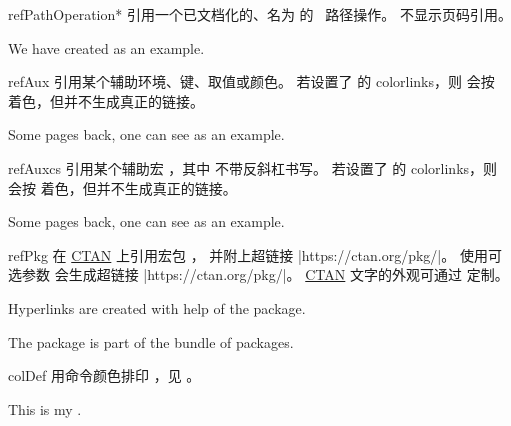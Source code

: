 \begin{docCommand}[doc new=2019-09-17]{refPathOperation*}{}
  引用一个已文档化的、名为  的 \tikzname\ 路径操作。
  不显示页码引用。
\begin{dispExample}
We have created  as an example.
\end{dispExample}
\end{docCommand}



\begin{docCommand}[doc updated=2020-02-11]{refAux}{}
  引用某个辅助环境、键、取值或颜色。
  若设置了  的 colorlinks，则  会按
   着色，但并不生成真正的链接。
\begin{dispExample}
Some pages back, one can see  as an example.
\end{dispExample}
\end{docCommand}

\begin{docCommand}[doc updated=2020-02-11]{refAuxcs}{}
  引用某个辅助宏 ，其中  不带反斜杠书写。
  若设置了  的 colorlinks，则  会按
   着色，但并不生成真正的链接。
\begin{dispExample}
Some pages back, one can see  as an example.
\end{dispExample}
\end{docCommand}


\begin{docCommand}[doc new and updated={2024-09-18}{2024-11-29}]{refPkg}{}
  在 \href{https://ctan.org}{CTAN} 上引用宏包 ，
  并附上超链接 \mbox{|https://ctan.org/pkg/|}。
  使用可选参数  会生成超链接
  \mbox{|https://ctan.org/pkg/|}。
  \href{https://ctan.org}{CTAN} 文字的外观可通过
   定制。
\begin{dispExample}
Hyperlinks are created with help of the  package.\par
The package  is part of the
 bundle of packages.
\end{dispExample}
\end{docCommand}


\clearpage

\begin{docCommand}{colDef}{}
用命令颜色排印 ，见 。
\begin{dispExample}
This is my .
\end{dispExample}
\end{docCommand}

